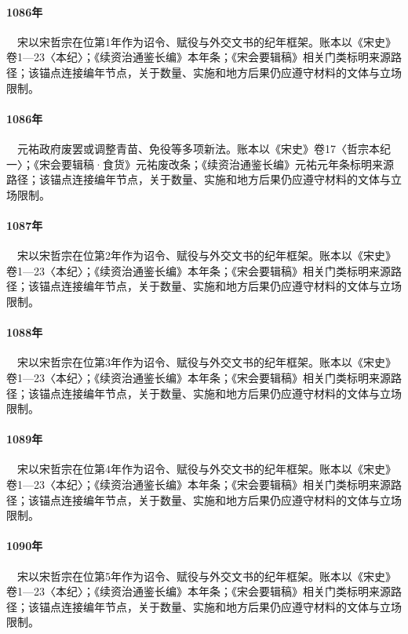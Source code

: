 \paragraph{1086年}　宋以宋哲宗在位第1年作为诏令、赋役与外交文书的纪年框架。账本以《宋史》卷1—23〈本纪〉；《续资治通鉴长编》本年条；《宋会要辑稿》相关门类标明来源路径；该锚点连接编年节点，关于数量、实施和地方后果仍应遵守材料的文体与立场限制。

\paragraph{1086年}　元祐政府废罢或调整青苗、免役等多项新法。账本以《宋史》卷17〈哲宗本纪一〉；《宋会要辑稿·食货》元祐废改条；《续资治通鉴长编》元祐元年条标明来源路径；该锚点连接编年节点，关于数量、实施和地方后果仍应遵守材料的文体与立场限制。

\paragraph{1087年}　宋以宋哲宗在位第2年作为诏令、赋役与外交文书的纪年框架。账本以《宋史》卷1—23〈本纪〉；《续资治通鉴长编》本年条；《宋会要辑稿》相关门类标明来源路径；该锚点连接编年节点，关于数量、实施和地方后果仍应遵守材料的文体与立场限制。

\paragraph{1088年}　宋以宋哲宗在位第3年作为诏令、赋役与外交文书的纪年框架。账本以《宋史》卷1—23〈本纪〉；《续资治通鉴长编》本年条；《宋会要辑稿》相关门类标明来源路径；该锚点连接编年节点，关于数量、实施和地方后果仍应遵守材料的文体与立场限制。

\paragraph{1089年}　宋以宋哲宗在位第4年作为诏令、赋役与外交文书的纪年框架。账本以《宋史》卷1—23〈本纪〉；《续资治通鉴长编》本年条；《宋会要辑稿》相关门类标明来源路径；该锚点连接编年节点，关于数量、实施和地方后果仍应遵守材料的文体与立场限制。

\paragraph{1090年}　宋以宋哲宗在位第5年作为诏令、赋役与外交文书的纪年框架。账本以《宋史》卷1—23〈本纪〉；《续资治通鉴长编》本年条；《宋会要辑稿》相关门类标明来源路径；该锚点连接编年节点，关于数量、实施和地方后果仍应遵守材料的文体与立场限制。

